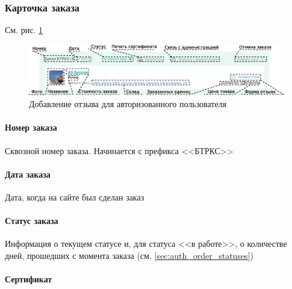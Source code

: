             \subsubsection{Карточка заказа}
                \par{
                См. рис. \ref{fig:auth_order_cart}
                }
                \begin{figure}
                    \center
                    \includegraphics[width=170mm]{04_auth_funcs/figures/12.eps}
                    \caption{Добавление отзыва для авторизованного пользователя}
                    \label{fig:auth_order_cart}
                \end{figure}

                \paragraph{Номер заказа}

                    \par{
                    Сквозной номер заказа. Начинается с префикса <<БТРКС>>
                    }

                \paragraph{Дата заказа}
                    \par{
                    Дата, когда на сайте  был сделан заказ
                    }
                \paragraph{Статус заказа}

                    \par{
                    Информация о текущем статусе и, для статуса <<в 
                    работе>>, о количестве дней, прошедших с момента заказа 
                    (см. \ref{sec:auth_order_statuses})
                    }

                \paragraph{Сертификат}

